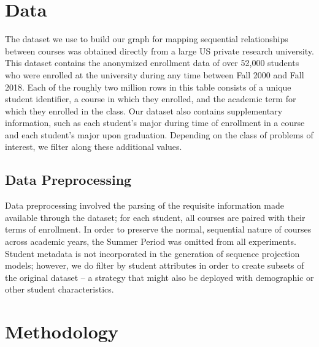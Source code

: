 \documentclass{sigchi}
\begin{document}
\section{Data}
\label{sec:data}
The dataset we use to build our graph for mapping sequential
relationships between courses was obtained directly from a large US private research university. This dataset contains the anonymized enrollment data of over 52,000 students who were enrolled at the university during any time
between Fall 2000 and Fall 2018. Each of the roughly two million rows
in this table consists of  a unique student identifier,  a course in
which they enrolled, and the academic term for which they enrolled in the class. Our dataset also contains supplementary information, such as each student's major during time of enrollment in a course and each student's major upon graduation. Depending on the class of problems of interest, we filter along these additional values.

\subsection{Data Preprocessing}
\label{sec:data_processing}

Data preprocessing involved the parsing of the requisite information made available through the dataset; for each student, all courses are paired with their terms of enrollment. In order to preserve the normal, sequential nature of courses across academic years, the Summer Period was omitted from all experiments. Student metadata is not incorporated in the generation of sequence projection models; however, we do filter by student attributes in order to create subsets of the original dataset -- a strategy that might also be deployed with demographic or other student characteristics.

\section{Methodology}
\label{sec:methodology}
\end{document}

